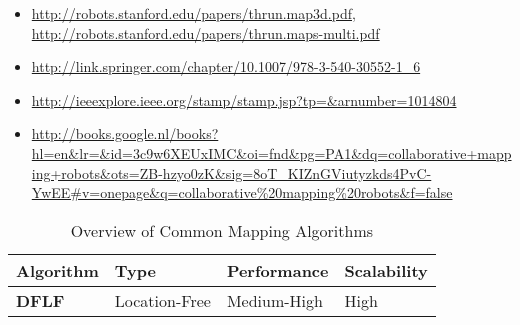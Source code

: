 \begin{itemize}
  \item \url{http://robots.stanford.edu/papers/thrun.map3d.pdf}, \url{http://robots.stanford.edu/papers/thrun.maps-multi.pdf}
  \item \url{http://link.springer.com/chapter/10.1007/978-3-540-30552-1_6}
  \item \url{http://ieeexplore.ieee.org/stamp/stamp.jsp?tp=&arnumber=1014804}
  \item \url{http://books.google.nl/books?hl=en&lr=&id=3c9w6XEUxIMC&oi=fnd&pg=PA1&dq=collaborative+mapping+robots&ots=ZB-hzyo0zK&sig=8oT_KIZnGViutyzkds4PvC-YwEE#v=onepage&q=collaborative%20mapping%20robots&f=false}
\end{itemize}

  \begin{table}[H]
  \renewcommand{\arraystretch}{1.3}
  \label{table_alg_mapping}
  \caption{Overview of Common Mapping Algorithms}
  \centering
    \begin{tabular}{|l|l|l|l|}
    \hline
    \bfseries Algorithm & \bfseries Type & \bfseries Performance & \bfseries Scalability\\
    \hline
    \bfseries DFLF& Location-Free & Medium-High & High\\\hline
    \end{tabular}
  \end{table}

